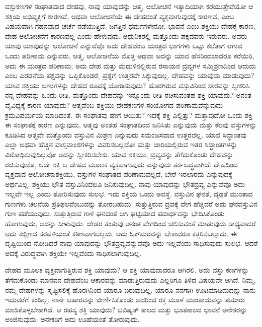\vskip 0.2cm

ವಸ್ತುಕಣಗಳ ಸಂಘಾತವಾದ ದೇಹವು, ನಾವು ಯಾವುದನ್ನು ಆತ್ಮ, ಆಲೋಚನೆ ಇತ್ಯಾದಿಯಾಗಿ ಕರೆಯುತ್ತೇವೆಯೋ ಆ ಶಕ್ತಿಯ ಅಭಿವ್ಯಕ್ತಿಗೆ ಕಾರಣವೆ, ಅಥವಾ ಆಲೋಚನೆಯೆ ಈ ದೇಹದಂತೆ ವ್ಯಕ್ತವಾಗುವುದಕ್ಕೆ ಕಾರಣವೆ, ಎಂಬ ವಿಷಯವಾಗಿ ಗಹನವಾದ ಚರ್ಚೆ ನಡೆಯುತ್ತಿದೆ. ಜಗತ್ತಿನ ಧರ್ಮಗಳೇನೋ, ಭಾವನೆ ಎಂಬ ಶಕ್ತಿಯು ದೇಹಕ್ಕೆ ಕಾರಣ, ದೇಹ ಆಲೋಚನೆಗೆ ಕಾರಣವಲ್ಲ ಎಂದು ಹೇಳುವುವು. ಆಧುನಿಕರಲ್ಲಿ ಮತ್ತೊಂದು ಪಕ್ಷದವರು ಇರುವರು. ಅವರು ಯಾವು ಯಾವುದನ್ನು ಆಲೋಚನೆ ಎನ್ನುವೆವೊ ಅದು ದೇಹವೆಂಬ ಯಂತ್ರದ ಭಾಗಗಳು ಒಟ್ಟು ಕಲೆತಾಗ ಆಗುವ ಒಂದು ಪರಿಣಾಮ ಎನ್ನುವರು. ಆತ್ಮ, ಆಲೋಚನೆಯ ಮೊತ್ತ ಅಥವಾ ಅದನ್ನು ಯಾವ ಹೆಸರಿಂದಲಾದರೂ ಕರೆಯಿರಿ, ಅದು ಈ ಯಂತ್ರದ ಪರಿಣಾಮ; ಅದು ದೇಹ ಮತ್ತು ಮೆದುಳಿನಲ್ಲಿರುವ ರಸಾಯನ ದ್ರವ್ಯಗಳ ಸಮ್ಮಿಶ್ರಣದಿಂದ ಆದುದು ಎಂಬ ಎರಡನೆಯ ಪಕ್ಷವನ್ನು ಒಪ್ಪಿಕೊಂಡರೆ, ಪ್ರಶ್ನೆಗೆ ಉತ್ತರವೇ ಸಿಕ್ಕುವುದಿಲ್ಲ. ದೇಹವನ್ನು ಯಾವುದು ಮಾಡುವುದು? ಯಾವ ಶಕ್ತಿಯು ಅಣುಗಳನ್ನು ದೇಹದ ರೂಪಕ್ಕೆ ಜೋಡಿಸುವುದು? ಹೊರಗಿರುವ ವಸ್ತುವಿನಿಂದ ಸಾರವನ್ನು ಸ್ವೀಕರಿಸಿ ನನ್ನ ದೇಹವನ್ನು ಒಂದು ರೀತಿ, ಮತ್ತೊಂದು ದೇಹವನ್ನು ಇನ್ನೊಂದು ರೀತಿ ರಚಿಸುವಂತಹ ಶಕ್ತಿ ಯಾವುದು? ಅನಂತ ವೈವಿಧ್ಯಕ್ಕೆ ಕಾರಣ ಯಾವುದು? ಆತ್ಮವೆಂಬ ಶಕ್ತಿಯು ದೇಹಕಣಗಳ ಸಂಯೋಗದ ಪರಿಣಾಮವೆನ್ನುವುದು ಕ್ರಮವಿಪರ್ಯಯ ಮಾಡಿದಂತೆ. ಈ ಸಂಘಾತವು ಹೇಗೆ ಆಯಿತು? ಇದಕ್ಕೆ ಶಕ್ತಿ ಎಲ್ಲಿತ್ತು? ಮತ್ತಾವುದೋ ಒಂದು ಶಕ್ತಿ ಈ ಸಂಘಾತಕ್ಕೆ ಕಾರಣ ಎನ್ನುವುದು, ಆತ್ಮವು ಅಂತಹ ಸಂಘಾತದಿಂದ ಜನಿಸಿತು ಎನ್ನುವುದು ಮತ್ತು ಕೆಲವು ವಸ್ತುಗಳನ್ನು ಕೂಡಿಸಿದ ಆತ್ಮವೇ ಮತ್ತೊಂದು ವಸ್ತುವಿನ ಮಿಶ್ರಣ ಎನ್ನುವುದು ಸಮಂಜಸವಾದ ಉತ್ತರವಲ್ಲ. ಯಾವ ಸಿದ್ಧಾಂತವು ಎಲ್ಲಾ ಅಥವಾ ಹೆಚ್ಚಿನ ವಾಸ್ತವಾಂಶಗಳನ್ನು ವಿವರಿಸಬಲ್ಲದೋ ಮತ್ತು ಜಾರಿಯಲ್ಲಿರುವ ಇತರ ಸಿದ್ಧಾಂತಗಳನ್ನು ವಿರೋಧಿಸುವುದಿಲ್ಲವೋ ಅದನ್ನು ಸ್ವೀಕರಿಸಬೇಕು. ಯಾವ ಶಕ್ತಿಯು, ದ್ರವ್ಯವನ್ನು ತೆಗೆದುಕೊಂಡು ದೇಹವನ್ನು ರಚಿಸುವುದೊ, ಅದೇ ಶಕ್ತಿ ಆ ದೇಹದ ಮೂಲಕ ವ್ಯಕ್ತವಾಗುವುದು ಎನ್ನುವುದು ತರ್ಕಬದ್ಧವಾಗಿದೆ. ದೇಹದಿಂದ ವ್ಯಕ್ತವಾದ ಆಲೋಚನಾಶಕ್ತಿಯು, ವಸ್ತುಗಳ ಸಂಘಾತದ ಪರಿಣಾಮವಲ್ಲದೆ, ಬೇರೆ ಇರಲಾರದು ಎನ್ನುವುದಕ್ಕೆ ಅರ್ಥವಿಲ್ಲ. ಶಕ್ತಿಯು ಭೌತ ವಸ್ತುವಿನಿಂದಲೂ ಜನಿಸುವುದಿಲ್ಲ. ನಾವು ಯಾವುದನ್ನು ಭೌತದ್ರವ್ಯ ಎನ್ನುವೆವೊ ಅದು ಇಲ್ಲವೇ ಇಲ್ಲ ಎಂದು ತೋರಿಸುವುದು ಸುಲಭ. ಇದು ಶಕ್ತಿಯ ಒಂದು ಅವಸ್ಥೆ. ವಸ್ತುವಿನ ಘನತೆ, ದೃಢತೆ ಮುಂತಾದ ಗುಣಗಳು ಚಲನೆಯ ಪ್ರತಿಫಲವೆಂಬುದನ್ನು ತೋರಬಹುದು. ಸುತ್ತುತ್ತಿರುವ ದ್ರವಕ್ಕೆ ವೇಗ ಹೆಚ್ಚಿದರೆ ಅದು ಘನವಸ್ತುವಿನ ಗುಣ ಪಡೆಯುವುದು. ಸುತ್ತುತ್ತಿರುವ ಗಾಳಿ ಘನದಂತೆ ಆಗಿ ಘಟ್ಟಿಯಾದ ಪದಾರ್ಥವನ್ನು ಭೇದಿಸಿಕೊಂಡು ಹೋಗುವುದು, ಅದನ್ನು ಸೀಳುವುದು. ಜೇಡರ ತಂತುವು ಅನಂತ ವೇಗದಿಂದ ಚಲಿಸುವಂತೆ ಮಾಡುವುದು ಸಾಧ್ಯವಾದರೆ ಅದು ಕಬ್ಬಿಣದ ಸರಪಳಿಯಂತೆ ಕಠಿಣವಾಗಬಲ್ಲದು. ಅದು ಓಕ್​ ಮರವನ್ನು ಬೇಕಾದರೂ ಕತ್ತರಿಸಬಲ್ಲುದು. ಈ ದೃಷ್ಟಿಯಿಂದ ನೋಡಿದರೆ ನಾವು ಯಾವುದನ್ನು ಭೌತದ್ರವ್ಯವೆನ್ನುವೆವೊ ಅದು ಇಲ್ಲವೆಂದು ಸಾಧಿಸುವುದು ಸುಲಭ. ಆದರೆ ಅದಕ್ಕೆ ವಿರುದ್ಧವಾಗಿ ಶಕ್ತಿಯೇ ಇಲ್ಲವೆಂದು ಸಾಧಿಸಲಾಗುವುದಿಲ್ಲ.

\vskip 0.2cm

ದೇಹದ ಮೂಲಕ ವ್ಯಕ್ತವಾಗುತ್ತಿರುವ ಶಕ್ತಿ ಯಾವುದು? ಆ ಶಕ್ತಿ ಯಾವುದಾದರೂ ಆಗಿರಲಿ. ಅದು ವಸ್ತು ಕಣಗಳನ್ನು ತೆಗೆದುಕೊಂಡು ಮಾನವನ ದೇಹವೆಂಬ ಆಕಾರವನ್ನು ಮಾಡುತ್ತಿರುವುದು ಎಲ್ಲರಿಗೂ ತಿಳಿದ ವಿಷಯವೇ ಆಗಿದೆ. ನಿಮ್ಮ, ನಮ್ಮ ದೇಹಗಳನ್ನು ಸೃಷ್ಟಿಸಲಿಕ್ಕೆ ಹೊರಗಿನಿಂದ ಯಾರೂ ಬರುವುದಿಲ್ಲ. ಯಾರೂ ನನಗಾಗಿ ಊಟಮಾಡಿದುದನ್ನು ನಾನು ಇದುವರೆಗೆ ಕಂಡಿಲ್ಲ. ನಾನೇ ಆಹಾರವನ್ನು ಜೀರ್ಣಿಸಿಕೊಂಡು ಅದರಿಂದ ರಕ್ತ ಮೂಳೆ ಮುಂತಾದುವನ್ನು ತಯಾರು ಮಾಡಿಕೊಳ್ಳಬೇಕಾಗಿದೆ. ಆ ರಹಸ್ಯ ಶಕ್ತಿ ಯಾವುದು? ಭವಿಷ್ಯತ್​ ಕಾಲದ ಮತ್ತು ಭೂತಕಾಲದ ಭಾವನೆ ಅನೇಕರನ್ನು ಅಂಜಿಸುವುದು. ಅನೇಕರಿಗೆ ಅದು ಊಹೆಯಂತೆ ತೋರುವುದು.

